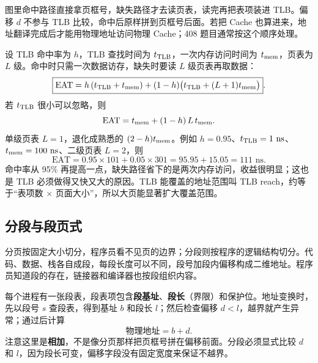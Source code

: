 图里命中路径直接拿页框号，缺失路径才去读页表，读完再把表项装进 TLB。偏移 $d$ 不参与 TLB 比较，命中后原样拼到页框号后面。若把 Cache 也算进来，地址翻译完成后才能用物理地址访问物理 Cache；408 题目通常按这个顺序处理。

设 TLB 命中率为 $h$，TLB 查找时间为 $t_{\rm TLB}$，一次内存访问时间为 $t_{\rm mem}$，页表为 $L$ 级。命中时只需一次数据访存，缺失时要读 $L$ 级页表再取数据：
\[
\boxed{\mathrm{EAT}=h\,(t_{\rm TLB}+t_{\rm mem})+(1-h)\bigl(t_{\rm TLB}+(L+1)t_{\rm mem}\bigr)}.
\]
若 $t_{\rm TLB}$ 很小可以忽略，则
\[
\mathrm{EAT}=t_{\rm mem}+(1-h)\,L\,t_{\rm mem}.
\]
单级页表 $L=1$，退化成熟悉的 $(2-h)t_{\rm mem}$。例如 $h=0.95$、$t_{\rm TLB}=1\text{ ns}$、$t_{\rm mem}=100\text{ ns}$、二级页表 $L=2$，则
\[
\mathrm{EAT}=0.95\times101+0.05\times301=95.95+15.05=111\text{ ns}.
\]
命中率从 95\% 再提高一点，缺失路径省下的是两次内存访问，收益很明显；这也是 TLB 必须做得又快又大的原因。TLB 能覆盖的地址范围叫 TLB reach，约等于“表项数 $\times$ 页面大小”，所以大页能显著扩大覆盖范围。

\subsection{分段与段页式}

分页按固定大小切分，程序员看不见页的边界；分段则按程序的逻辑结构切分。代码、数据、栈各自成段，每段长度可以不同，段号加段内偏移构成二维地址。程序员知道段的存在，链接器和编译器也按段组织内容。

每个进程有一张段表，段表项包含\textbf{段基址}、\textbf{段长}（界限）和保护位。地址变换时，先以段号 $s$ 查段表，得到基址 $b$ 和段长 $l$；然后检查偏移 $d<l$，越界就产生异常；通过后计算
\[
\text{物理地址}=b+d.
\]
注意这里是\textbf{相加}，不是像分页那样把页框号拼在偏移前面。分段必须显式比较 $d$ 和 $l$，因为段长可变，偏移字段没有固定宽度来保证不越界。

